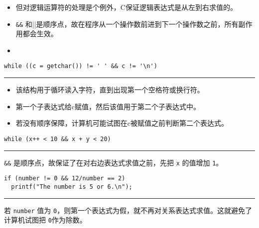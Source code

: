 \begin{frame}[fragile]
\begin{itemize}
\item  但对逻辑运算符的处理是个例外，C保证逻辑表达式是从左到右求值的。\\[0.2in]
\item 
 \lstinline|&&| 和{\tf ||}是顺序点，故在程序从一个操作数前进到下一个操作数之前，所有副作用都会生效。\\[0.2in]
\item 
{}
\end{itemize}

\end{frame}


\begin{frame}[fragile]
\begin{lstlisting}
while ((c = getchar()) != ' ' && c != '\n') 
\end{lstlisting} 

\rule{\textwidth}{.5mm} \pause \vspace{0.5mm}
\begin{itemize}
\item
该结构用于循环读入字符，直到出现第一个空格符或换行符。
\item 
第一个子表达式给c赋值，然后该值用于第二个子表达式中。
\item
若没有顺序保障，计算机可能试图在c被赋值之前判断第二个表达式。
\end{itemize}
\end{frame}



\begin{frame}[fragile]
\begin{lstlisting}
while (x++ < 10 && x + y < 20) 
\end{lstlisting} 

\rule{\textwidth}{.5mm} \pause \vspace{0.5mm}

 \lstinline|&&| 是顺序点，故保证了在对右边表达式求值之前，先把 \lstinline|x| 的值增加 \lstinline|1|。
\end{frame}


\begin{frame}[fragile]
\begin{lstlisting}
if (number != 0 && 12/number == 2)
  printf("The number is 5 or 6.\n");
\end{lstlisting} 

\rule{\textwidth}{.5mm} \pause \vspace{0.5mm}

若 \lstinline|number| 值为 \lstinline|0|，则第一个表达式为假，就不再对关系表达式求值。这就避免了计算机试图把 \lstinline|0|作为除数。
\end{frame}


